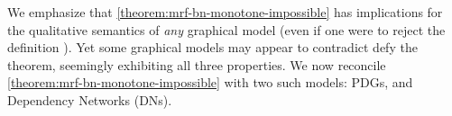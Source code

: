 We emphasize that \cref{theorem:mrf-bn-monotone-impossible} has implications for the qualitative semantics of \emph{any} graphical model (even if one were to reject the definition \scibility). 
%
Yet some graphical models may appear to \ifjoewording contradict \else defy \fi the theorem,
    seemingly exhibiting all three properties. 
We now reconcile \cref{theorem:mrf-bn-monotone-impossible} with 
    two such models: PDGs, and Dependency Networks (DNs). 


